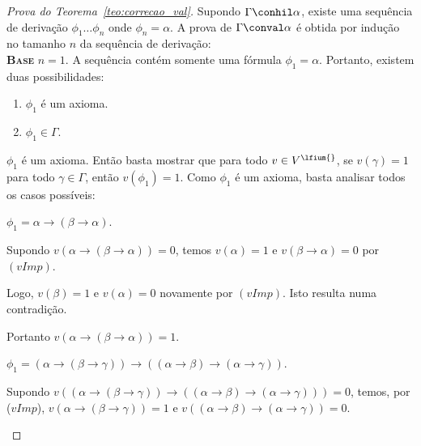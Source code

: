         \begin{proof}[Prova do Teorema~\ref{teo:correcao_val}]
            Supondo $\Gamma \conhil \alpha$, existe uma sequência de derivação $\phi_{1} \ldots \phi_{n}$ onde $\phi_{n} = \alpha$. A prova de $\Gamma \conval \alpha$ é obtida por indução no tamanho $n$ da sequência de derivação:\\
    
            \noindent \textbf{\textsc{Base}} $n = 1$. A sequência contém somente uma fórmula $\phi_{1} = \alpha$. Portanto, existem duas possibilidades:
            \begin{enumerate}
                \item $\phi_{1}$ é um axioma.
                \item $\phi_{1} \in \Gamma$.
            \end{enumerate}
    
            \begin{provaporcasos}
                
                \casodeprova{} $\phi_{1}$ é um axioma. Então basta mostrar que para todo $v \in V^{\lfium{}}$, se $v(\gamma) = 1$ para todo $\gamma \in \Gamma$, então $v(\phi_{1}) = 1$. Como $\phi_{1}$ é um axioma, basta analisar todos os casos possíveis:
    
                \begin{provaporsubcasos}
                    
                    \subcasodeprova{} $\phi_{1} = \alpha \to (\beta \to \alpha)$.
    
                        Supondo $v(\alpha \to (\beta \to \alpha)) = 0$, temos $v(\alpha) = 1$ e $v(\beta \to \alpha) = 0$ por $(vImp)$. 
                            
                        Logo, $v(\beta) = 1$ e $v(\alpha) = 0$ novamente por $(vImp)$. Isto resulta numa contradição. 
                        
                        Portanto $v(\alpha \to (\beta \to \alpha)) = 1$.
    
                    \subcasodeprova{} $\phi_{1} = (\alpha \to (\beta \to \gamma)) \to ((\alpha \to \beta) \to (\alpha \to \gamma ))$.
                    
                        Supondo $v((\alpha \to (\beta \to \gamma)) \to ((\alpha \to \beta) \to (\alpha \to \gamma))) = 0$, temos, por ($vImp$), $v(\alpha \to (\beta \to \gamma)) = 1 \text{ e } v((\alpha \to \beta) \to (\alpha \to \gamma)) = 0$.
    

\end{provaporsubcasos}
\end{provaporcasos}
\end{proof}
